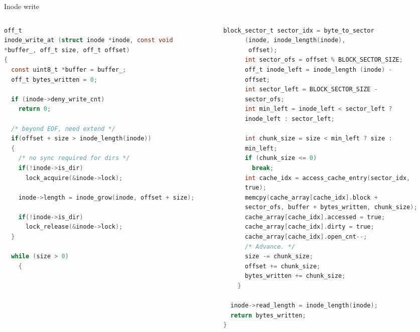 \documentclass[10pt]{beamer}
\begin{document}
\begin{frame}[fragile]{Inode write}
\begin{columns}
\begin{column}{0.5\textwidth}
\begin{lstlisting}[language=C]
off_t
inode_write_at (struct inode *inode, const void 
*buffer_, off_t size, off_t offset) 
{
  const uint8_t *buffer = buffer_;
  off_t bytes_written = 0;

  if (inode->deny_write_cnt)
    return 0;

  /* beyond EOF, need extend */
  if(offset + size > inode_length(inode))
  {
    /* no sync required for dirs */
    if(!inode->is_dir)
      lock_acquire(&inode->lock);

    inode->length = inode_grow(inode, offset + size);

    if(!inode->is_dir)
      lock_release(&inode->lock);
  }

  while (size > 0) 
    {
\end{lstlisting}
\end{column}
\begin{column}{0.5\textwidth}
\begin{lstlisting}[language=C]
      block_sector_t sector_idx = byte_to_sector
      (inode, inode_length(inode),
       offset);
      int sector_ofs = offset % BLOCK_SECTOR_SIZE;
      off_t inode_left = inode_length (inode) - 
      offset;
      int sector_left = BLOCK_SECTOR_SIZE - 
      sector_ofs;
      int min_left = inode_left < sector_left ? 
      inode_left : sector_left;

      int chunk_size = size < min_left ? size : 
      min_left;
      if (chunk_size <= 0)
        break;
      int cache_idx = access_cache_entry(sector_idx, 
      true);
      memcpy(cache_array[cache_idx].block + 
      sector_ofs, buffer + bytes_written, chunk_size);
      cache_array[cache_idx].accessed = true;
      cache_array[cache_idx].dirty = true;
      cache_array[cache_idx].open_cnt--;
      /* Advance. */
      size -= chunk_size;
      offset += chunk_size;
      bytes_written += chunk_size;
    }

  inode->read_length = inode_length(inode);
  return bytes_written;
}
\end{lstlisting}
\end{column}
\end{columns}
\end{frame}
\end{document}
